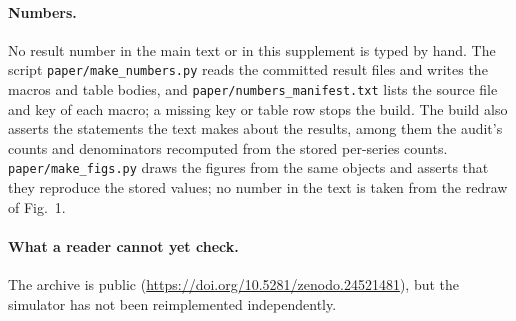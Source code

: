 \documentclass[aps,pre,twocolumn,superscriptaddress,nofootinbib,9pt]{revtex4-2}
\begin{document}
\paragraph*{Numbers.} No result number in the main text or in this supplement is typed by hand. The script \texttt{paper/make\_numbers.py} reads the committed result files and writes the macros and table bodies, and \texttt{paper/numbers\_manifest.txt} lists the source file and key of each macro; a missing key or table row stops the build. The build also asserts the statements the text makes about the results, among them the audit's counts and denominators recomputed from the stored per-series counts. \texttt{paper/make\_figs.py} draws the figures from the same objects and asserts that they reproduce the stored values; no number in the text is taken from the redraw of Fig.~1.

\paragraph*{What a reader cannot yet check.} The archive is public (\url{https://doi.org/10.5281/zenodo.24521481}), but the simulator has not been reimplemented independently.


\footnotesize

\end{document}
